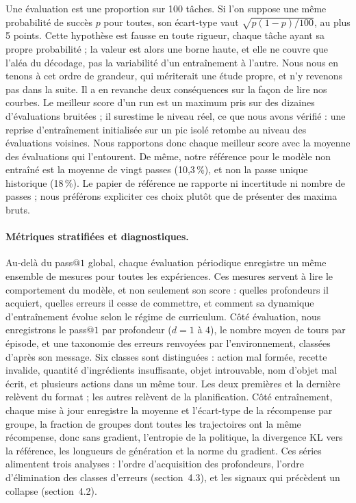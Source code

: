 \documentclass[11pt,a4paper]{article}
\begin{document}
Une évaluation est une proportion sur 100 tâches. Si l'on suppose une même probabilité de succès $p$ pour toutes, son écart-type vaut $\sqrt{p(1-p)/100}$, au plus 5 points. Cette hypothèse est fausse en toute rigueur, chaque tâche ayant sa propre probabilité ; la valeur est alors une borne haute, et elle ne couvre que l'aléa du décodage, pas la variabilité d'un entraînement à l'autre. Nous nous en tenons à cet ordre de grandeur, qui mériterait une étude propre, et n'y revenons pas dans la suite. Il a en revanche deux conséquences sur la façon de lire nos courbes. Le meilleur score d'un run est un maximum pris sur des dizaines d'évaluations bruitées ; il surestime le niveau réel, ce que nous avons vérifié : une reprise d'entraînement initialisée sur un pic isolé retombe au niveau des évaluations voisines. Nous rapportons donc chaque meilleur score avec la moyenne des évaluations qui l'entourent. De même, notre référence pour le modèle non entraîné est la moyenne de vingt passes (10{,}3\,\%), et non la passe unique historique (18\,\%). Le papier de référence ne rapporte ni incertitude ni nombre de passes ; nous préférons expliciter ces choix plutôt que de présenter des maxima bruts.


\paragraph{Métriques stratifiées et diagnostiques.} Au-delà du pass@$1$ global, chaque évaluation périodique enregistre un même ensemble de mesures pour toutes les expériences. Ces mesures servent à lire le comportement du modèle, et non seulement son score : quelles profondeurs il acquiert, quelles erreurs il cesse de commettre, et comment sa dynamique d'entraînement évolue selon le régime de curriculum. Côté évaluation, nous enregistrons le pass@$1$ par profondeur ($d=1$ à $4$), le nombre moyen de tours par épisode, et une taxonomie des erreurs renvoyées par l'environnement, classées d'après son message. Six classes sont distinguées : action mal formée, recette invalide, quantité d'ingrédients insuffisante, objet introuvable, nom d'objet mal écrit, et plusieurs actions dans un même tour. Les deux premières et la dernière relèvent du format ; les autres relèvent de la planification. Côté entraînement, chaque mise à jour enregistre la moyenne et l'écart-type de la récompense par groupe, la fraction de groupes dont toutes les trajectoires ont la même récompense, donc sans gradient, l'entropie de la politique, la divergence KL vers la référence, les longueurs de génération et la norme du gradient. Ces séries alimentent trois analyses : l'ordre d'acquisition des profondeurs, l'ordre d'élimination des classes d'erreurs (section~4.3), et les signaux qui précèdent un collapse (section~4.2).
\end{document}

